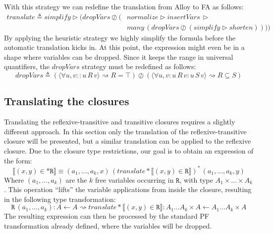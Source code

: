 \documentclass{llncs}
\begin{document}
With this strategy we can redefine the translation from Alloy to FA as follows:
\begin{align*}
\mathit{translate} \triangleq \mathit{simplify} \triangleright (\mathit{dropVars} \oslash (&\mathit{normalize} \triangleright \mathit{insertVars} \, \triangleright \\ & \mathit{many} \, (\mathit{dropVars} \oslash (\mathit{simplify} \triangleright \mathit{shorten}))))
\end{align*}
By applying the heuristic strategy we highly simplify the formula
before the automatic translation kicks in. At this point, the
expression might even be in a shape where variables can be
dropped. Since it keeps the range in universal quantifiers, the
$\mathit{dropVars}$ strategy must be redefined as follows:
\begin{equation*}
  \mathit{dropVars} \triangleq (\langle \forall u,v :: u \, R \, v \rangle \rightsquigarrow R = \top) \oslash (\langle \forall u,v : u \, R \, v : u \, S \, v\rangle \rightsquigarrow R \subseteq S)
\end{equation*}

\subsection{Translating the closures}
Translating the reflexive-transitive and transitive closures requires a slightly different approach. In this section only the translation of the reflexive-transitive closure will be presented, but a similar translation can be applied to the reflexive closure. Due to the closure type restrictions, our goal is to obtain an expression of the form:
\begin{equation}
	\llbracket (x,y) \in \mathtt{*R} \rrbracket \equiv (a_1,\dots,a_k,x) \, (\mathit{translate*} \llbracket (x,y) \in \mathtt{R} \rrbracket)^* \, (a_1,\dots,a_k,y)
\end{equation}
Where $(a_1,\dots,a_k)$ are the $k$ free variables occurring in $\mathtt{R}$, with type $A_1 \times \dots \times A_k$. This operation ``lifts'' the variable applications from inside the closure, resulting in the following type transformation:
\begin{equation*}
	\mathtt{R} \, (a_1,\dots,a_k) : A \leftarrow A \rightsquigarrow \mathit{translate*} \llbracket (x,y) \in \mathtt{R} \rrbracket : A_1 \dots A_k \times A \leftarrow A_1 \dots A_k \times A 
\end{equation*}
The resulting expression can then be processed by the standard PF transformation already defined, where the variables will be dropped.
\end{document}

